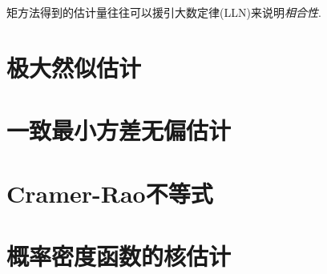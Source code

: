 \begin{remark}
    矩方法得到的估计量往往可以援引大数定律(LLN)来说明\emph{相合性}. 
\end{remark}

\section{极大然似估计}

\section{一致最小方差无偏估计}

\section{Cramer-Rao不等式}

\section{概率密度函数的核估计}
